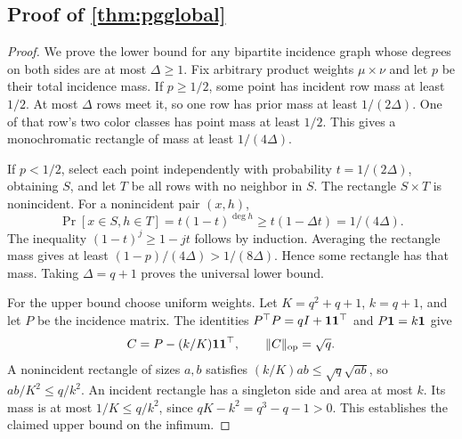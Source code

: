 \subsection[Proof of result pgglobal]{Proof of \cref{thm:pgglobal}}\label{proof:pgglobal}
\begin{proof}
We prove the lower bound for any bipartite incidence graph whose degrees on both sides are at most $\Delta\ge1$. Fix arbitrary product weights $\mu\times\nu$ and let $p$ be their total incidence mass. If $p\ge1/2$, some point has incident row mass at least $1/2$. At most $\Delta$ rows meet it, so one row has prior mass at least $1/(2\Delta)$. One of that row's two color classes has point mass at least $1/2$. This gives a monochromatic rectangle of mass at least $1/(4\Delta)$.

If $p<1/2$, select each point independently with probability $t=1/(2\Delta)$, obtaining $S$, and let $T$ be all rows with no neighbor in $S$. The rectangle $S\times T$ is nonincident. For a nonincident pair $(x,h)$,
\[
 \Pr[x\in S,h\in T]=t(1-t)^{\deg h}
 \ge t(1-\Delta t)=1/(4\Delta).
\]
The inequality $(1-t)^j\ge1-jt$ follows by induction. Averaging the rectangle mass gives at least $(1-p)/(4\Delta)>1/(8\Delta)$. Hence some rectangle has that mass. Taking $\Delta=q+1$ proves the universal lower bound.

For the upper bound choose uniform weights. Let $K=q^2+q+1$, $k=q+1$, and let $P$ be the incidence matrix. The identities $P^\top P=qI+\mathbf 1\mathbf 1^\top$ and $P\mathbf 1=k\mathbf 1$ give
\[
 C=P-(k/K)\mathbf 1\mathbf 1^\top,\qquad \|C\|_{\rm op}=\sqrt q.
\]
A nonincident rectangle of sizes $a,b$ satisfies $(k/K)ab\le\sqrt q\sqrt{ab}$, so $ab/K^2\le q/k^2$. An incident rectangle has a singleton side and area at most $k$. Its mass is at most $1/K\le q/k^2$, since $qK-k^2=q^3-q-1>0$. This establishes the claimed upper bound on the infimum.
\end{proof}

